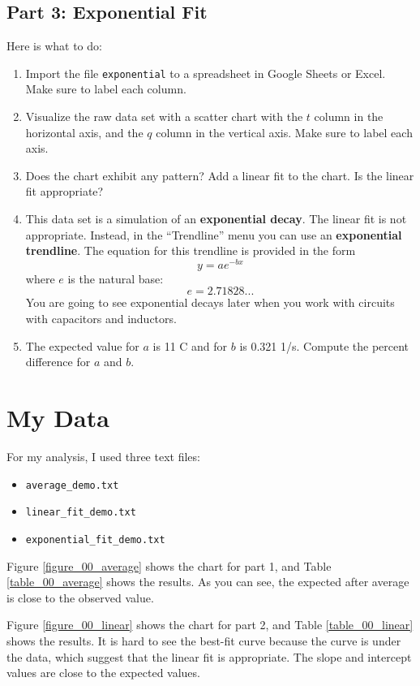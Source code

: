 \subsection{Part 3: Exponential Fit}
%
Here is what to do:
\begin{enumerate}
    \item Import the file \texttt{exponential} to a spreadsheet in Google Sheets or Excel. Make sure to label each column.
    \item Visualize the raw data set with a scatter chart with the $t$ column in the horizontal axis, and the $q$ column in the vertical axis. Make sure to label each axis.
    \item Does the chart exhibit any pattern? Add a linear fit to the chart. Is the linear fit appropriate?
    \item This data set is a simulation of an \textbf{exponential decay}. The linear fit is not appropriate. Instead, in the ``Trendline'' menu you can use an \textbf{exponential trendline}. The equation for this trendline is provided in the form
    \begin{equation}
        y = a e^{-bx}
    \end{equation}
    where $e$ is the natural base:
    \begin{equation*}
        e = 2.71828...
    \end{equation*}
    You are going to see exponential decays later when you work with circuits with capacitors and inductors.
    \item The expected value for $a$ is 11 C and for $b$ is 0.321 1/s. Compute the percent  difference for $a$ and $b$.
\end{enumerate}
%
\section{My Data}
%
For my analysis, I used three text files:
\begin{itemize}
    \item \texttt{average\_demo.txt}
    \item \texttt{linear\_fit\_demo.txt}
    \item \texttt{exponential\_fit\_demo.txt}
\end{itemize}
Figure \ref{figure_00_average} shows the chart for part 1, and Table \ref{table_00_average} shows the results. As you can see, the expected after average is close to the observed value.

Figure \ref{figure_00_linear} shows the chart for part 2, and Table \ref{table_00_linear} shows the results. It is hard to see the best-fit curve because the curve is under the data, which suggest that the linear fit is appropriate. The slope and intercept values are close to the expected values.

